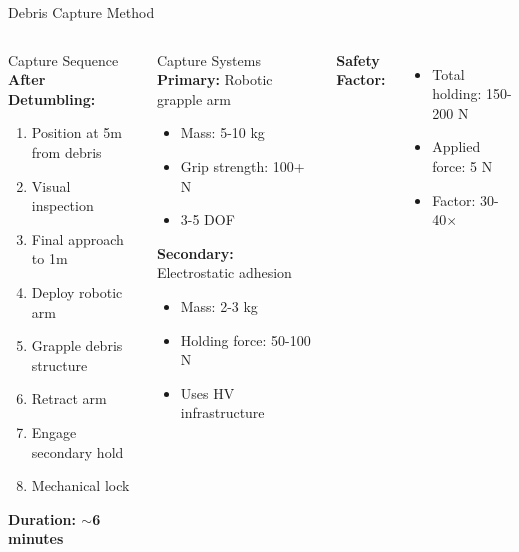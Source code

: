 \documentclass[aspectratio=169]{beamer}
\begin{document}
\begin{frame}{Debris Capture Method}
\begin{columns}[t]
\begin{block}{Capture Sequence}
\textbf{After Detumbling:}
\begin{enumerate}
    \item Position at 5m from debris
    \item Visual inspection
    \item Final approach to 1m
    \item Deploy robotic arm
    \item Grapple debris structure
    \item Retract arm
    \item Engage secondary hold
    \item Mechanical lock
\end{enumerate}
\textbf{Duration: $\sim$6 minutes}
\end{block}

\begin{block}{Capture Systems}
\textbf{Primary:} Robotic grapple arm
\begin{itemize}
    \item Mass: 5-10 kg
    \item Grip strength: 100+ N
    \item 3-5 DOF
\end{itemize}

\vspace{0.2cm}
\textbf{Secondary:} Electrostatic adhesion
\begin{itemize}
    \item Mass: 2-3 kg
    \item Holding force: 50-100 N
    \item Uses HV infrastructure
\end{itemize}
\end{block}

\textbf{Safety Factor:}
\begin{itemize}
    \item Total holding: 150-200 N
    \item Applied force: 5 N
    \item Factor: 30-40$\times$
\end{itemize}
\end{columns}
\end{frame}
\end{document}
